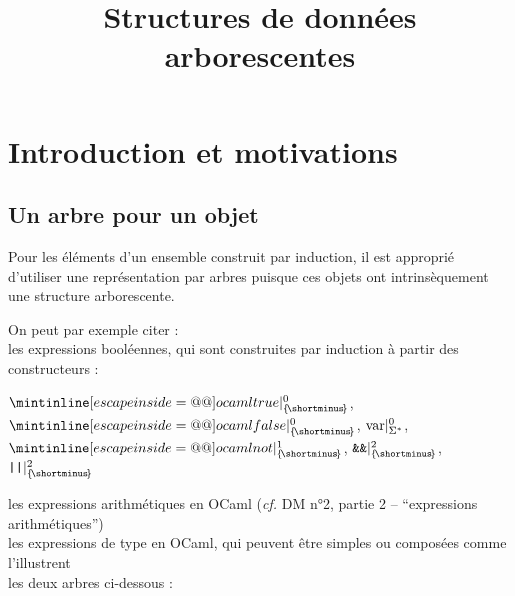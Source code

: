 
\newcommand{\constr}[2]{|_{#2}^{#1}}
\newcommand{\varconstr}[2]{|_{\scriptscriptstyle #2}^{\scriptscriptstyle #1}}
\newcommand{\noset}{\{\! \shortminus \!\}}
\newcommand{\AB}{\scr{A}_{\!B}}
\newcommand{\ABS}{\scr{A}_{\!B}(\cal{S})}
\newcommand{\ABE}{\scr{A}_{\!B}(\cal{E})}
\newcommand{\Bij}{\scr{B} \hspace{-0.5mm} i \! j}
\newcommand{\AdtqS}{\scr{A}_{2,3,4}(\cal{S})}

\usepackage{euscript}

\newcommand{\V}{\rm{V}}
\newcommand{\N}{N}
\DeclareMathOperator{\ch}{ch}
\DeclareMathOperator{\et}{et}
\DeclareMathOperator{\prof}{prof}
\DeclareMathOperator{\uni}{uni}

\renewcommand{\parallel}{\,/\hs{-1}/\,}


	
\title{Structures de données arborescentes}

\section{Introduction et motivations}

	\subsection{Un arbre pour un objet}
		
		Pour les éléments d'un ensemble construit par induction, il est approprié d'utiliser une représentation par arbres puisque ces objets ont intrinsèquement une structure arborescente.
		
		\begin{Exemples}
			On peut par exemple citer : \\
			\bdot les expressions booléennes, qui sont construites par induction à partir des constructeurs :  \begin{center}
				\(\caml{true} \constr{0}{\noset}\), \(\caml{false} \constr{0}{\noset}\), \(\rm{var} \constr{0}{\Sigma^*}\), \(\caml{not} \constr{1}{\noset}\), \(\text{\texttt{\&\&}} \constr{2}{\noset}\), \(\text{\texttt{||}} \constr{2}{\noset}\)
			\end{center}
			\bdot les expressions arithmétiques en OCaml (\emph{cf.} DM n°2, partie 2 -- ``expressions arithmétiques'') \\
			\bdot les expressions de type en OCaml, qui peuvent être simples ou composées comme l'illustrent \\
			\listspace les deux arbres ci-dessous :
		\end{Exemples}
	
